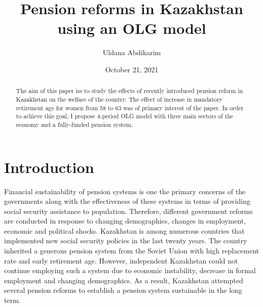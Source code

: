 \documentclass[BufferStockTheory]{subfiles}
\begin{document}
\providecommand{\versn}{pdf} %
\ifthenelse{\boolean{Web}}{    %
  \renewcommand{\versn}{Web}     %
  \renewcommand{\rootFromOut}{.} %
}{}  %


\title{Pension reforms in Kazakhstan using an OLG model}

\author{Uldana Abdikarim\authNum}



\renewcommand{\forcedate}{October 21, 2021}\date{\forcedate}

\maketitle
\hypertarget{abstract}{}
\begin{abstract}
  The aim of this paper iss to study the effects of recently introduced pension reform in Kazakhstan on the welfare of the country. The effect of increase in mandatory retirement age for women from 58 to 63 was of primary interest of the paper. In order to achieve this goal, I propose 4-period OLG model with three main sectors of the economy and a fully-funded pension system.
\end{abstract}





{\titlepagefinish}

\hypertarget{Introduction}{}
\section{Introduction}\label{sec:intro}
Financial sustainability of pension systems is one the primary concerns of the governments along with the effectiveness of these systems in terms of providing social security assistance to population. Therefore, different government reforms are conducted in response to changing demographics, changes in employment, economic and political shocks. Kazakhstan is among numerous countries that implemented new social security policies in the last twenty years. The country inherited a generous pension system from the Soviet Union with high replacement rate and early retirement age. However, independent Kazakhstan could not continue employing such a system due to economic instability, decrease in formal employment and changing demographics. As a result, Kazakhstan attempted several pension reforms to establish a pension system sustainable in the long term. 
\end{document}
